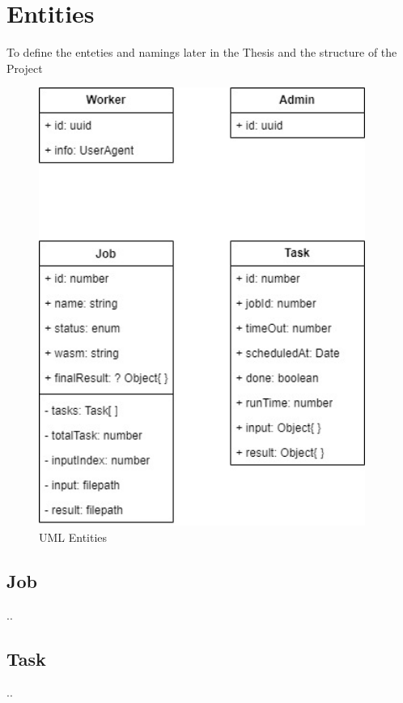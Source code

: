 \section{Entities}
\label{sec:methodology:entities}
To define the enteties and namings later in the Thesis and the structure of the Project

\begin{figure}[htbp]
  \centering
  \includegraphics[width=0.95\textwidth]{gfx/figures/Entities.jpg}
  \caption{UML Entities}
  \label{fig:methodology:entities}
\end{figure}

\subsection{Job}
\label{subsec:methodology:entities:job}
..
\subsection{Task}
\label{subsec:methodology:entities:task}
..
